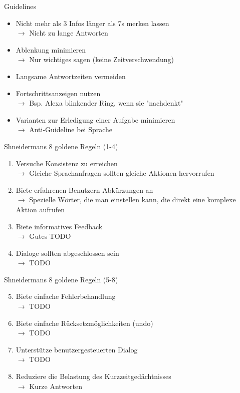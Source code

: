 \documentclass[
  10pt
, handout
]{beamer}
\begin{document}
\begin{frame}{Guidelines}
  \begin{itemize}
    \item Nicht mehr als 3 Infos länger als 7s merken lassen
    \\ $\rightarrow$  Nicht zu lange Antworten
    \item Ablenkung minimieren \\ $\rightarrow$ Nur wichtiges sagen (keine Zeitverschwendung)
    \item Langsame Antwortzeiten vermeiden
    \item Fortschrittsanzeigen nutzen \\ $\rightarrow$ Bsp. Alexa blinkender Ring, wenn sie "nachdenkt"
    \item Varianten zur Erledigung einer Aufgabe minimieren \\ $\rightarrow$ Anti-Guideline bei Sprache
  \end{itemize}
\end{frame}

\begin{frame}{Shneidermans 8 goldene Regeln (1-4)}
  \begin{enumerate}
    \item<+-> Versuche Konsistenz zu erreichen \\ $\rightarrow$ Gleiche Sprachanfragen sollten gleiche Aktionen hervorrufen
    \item<+-> Biete erfahrenen Benutzern Abkürzungen an \\ $\rightarrow$ Spezielle Wörter, die man einstellen kann, die direkt eine komplexe Aktion aufrufen
    \item<+-> Biete informatives Feedback \\ $\rightarrow$ Gutes TODO
    \item<+-> Dialoge sollten abgeschlossen sein \\ $\rightarrow$ TODO
  \end{enumerate}
\end{frame}

\begin{frame}{Shneidermans 8 goldene Regeln (5-8)}
  \begin{enumerate}
    \setcounter{enumi}{4}
    \item<+-> Biete einfache Fehlerbehandlung \\ $\rightarrow$ TODO
    \item<+-> Biete einfache Rücksetzmöglichkeiten (undo) \\ $\rightarrow$ TODO
    \item<+-> Unterstütze benutzergesteuerten Dialog \\ $\rightarrow$ TODO
    \item<+-> Reduziere die Belastung des Kurzzeitgedächtnisses \\ $\rightarrow$ Kurze Antworten
  \end{enumerate}
\end{frame}
\end{document}
